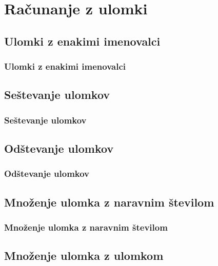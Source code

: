 \section{Računanje z ulomki}

\begin{frame}
    \sectionpage
\end{frame}

\begin{frame}
\end{frame}

    \subsection{Ulomki z enakimi imenovalci}

        \begin{frame}
            \frametitle{Ulomki z enakimi imenovalci}
        \end{frame}

    \subsection{Seštevanje ulomkov}

        \begin{frame}
            \frametitle{Seštevanje ulomkov}
        \end{frame}

    \subsection{Odštevanje ulomkov}

        \begin{frame}
            \frametitle{Odštevanje ulomkov}
        \end{frame}

    \subsection{Množenje ulomka z naravnim številom}

        \begin{frame}
            \frametitle{Množenje ulomka z naravnim številom}
        \end{frame}

    \subsection{Množenje ulomka z ulomkom}

